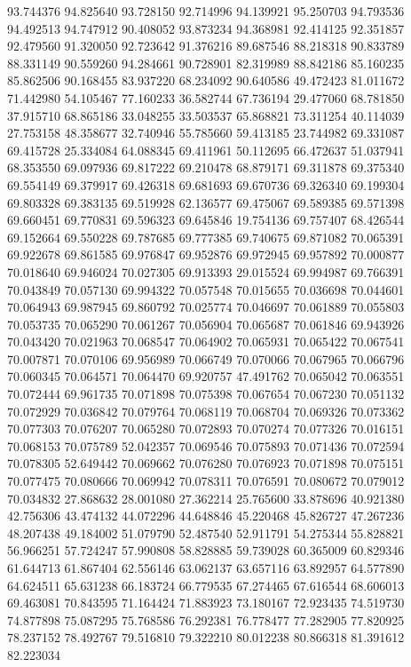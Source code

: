 93.744376
94.825640
93.728150
92.714996
94.139921
95.250703
94.793536
94.492513
94.747912
90.408052
93.873234
94.368981
92.414125
92.351857
92.479560
91.320050
92.723642
91.376216
89.687546
88.218318
90.833789
88.331149
90.559260
94.284661
90.728901
82.319989
88.842186
85.160235
85.862506
90.168455
83.937220
68.234092
90.640586
49.472423
81.011672
71.442980
54.105467
77.160233
36.582744
67.736194
29.477060
68.781850
37.915710
68.865186
33.048255
33.503537
65.868821
73.311254
40.114039
27.753158
48.358677
32.740946
55.785660
59.413185
23.744982
69.331087
69.415728
25.334084
64.088345
69.411961
50.112695
66.472637
51.037941
68.353550
69.097936
69.817222
69.210478
68.879171
69.311878
69.375340
69.554149
69.379917
69.426318
69.681693
69.670736
69.326340
69.199304
69.803328
69.383135
69.519928
62.136577
69.475067
69.589385
69.571398
69.660451
69.770831
69.596323
69.645846
19.754136
69.757407
68.426544
69.152664
69.550228
69.787685
69.777385
69.740675
69.871082
70.065391
69.922678
69.861585
69.976847
69.952876
69.972945
69.957892
70.000877
70.018640
69.946024
70.027305
69.913393
29.015524
69.994987
69.766391
70.043849
70.057130
69.994322
70.057548
70.015655
70.036698
70.044601
70.064943
69.987945
69.860792
70.025774
70.046697
70.061889
70.055803
70.053735
70.065290
70.061267
70.056904
70.065687
70.061846
69.943926
70.043420
70.021963
70.068547
70.064902
70.065931
70.065422
70.067541
70.007871
70.070106
69.956989
70.066749
70.070066
70.067965
70.066796
70.060345
70.064571
70.064470
69.920757
47.491762
70.065042
70.063551
70.072444
69.961735
70.071898
70.075398
70.067654
70.067230
70.051132
70.072929
70.036842
70.079764
70.068119
70.068704
70.069326
70.073362
70.077303
70.076207
70.065280
70.072893
70.070274
70.077326
70.016151
70.068153
70.075789
52.042357
70.069546
70.075893
70.071436
70.072594
70.078305
52.649442
70.069662
70.076280
70.076923
70.071898
70.075151
70.077475
70.080666
70.069942
70.078311
70.076591
70.080672
70.079012
70.034832
27.868632
28.001080
27.362214
25.765600
33.878696
40.921380
42.756306
43.474132
44.072296
44.648846
45.220468
45.826727
47.267236
48.207438
49.184002
51.079790
52.487540
52.911791
54.275344
55.828821
56.966251
57.724247
57.990808
58.828885
59.739028
60.365009
60.829346
61.644713
61.867404
62.556146
63.062137
63.657116
63.892957
64.577890
64.624511
65.631238
66.183724
66.779535
67.274465
67.616544
68.606013
69.463081
70.843595
71.164424
71.883923
73.180167
72.923435
74.519730
74.877898
75.087295
75.768586
76.292381
76.778477
77.282905
77.820925
78.237152
78.492767
79.516810
79.322210
80.012238
80.866318
81.391612
82.223034
